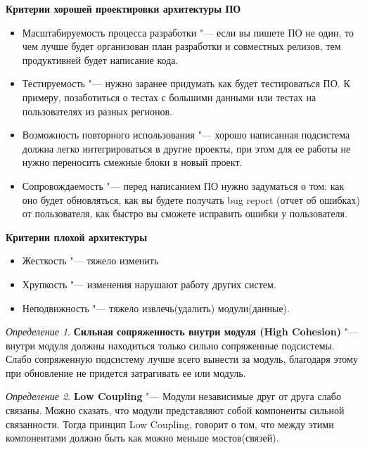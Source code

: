 \documentclass[bachelor, och, pract]{SCWorks}
\theoremstyle{remark}
\newtheorem{definition}{Определение}
\begin{document}
    \hfill \break
    \textbf{Критерии хорошей проектировки архитектуры ПО}

    \begin{itemize}[label=$\bullet$]
        \item Масштабируемость процесса разработки "--- если вы пишете ПО не один, то чем лучше будет организован план разработки и совместных релизов, тем продуктивней будет написание кода.
        \item Тестируемость "--- нужно заранее придумать как будет тестироваться ПО. К примеру, позаботиться о тестах с большими данными или тестах на пользователях из разных регионов.
        \item Возможность повторного использования "--- хорошо написанная подсистема должна легко интегрироваться в другие проекты, при этом для ее работы не нужно переносить смежные блоки в новый проект.
        \item Сопровождаемость "--- перед написанием ПО нужно задуматься о том: как оно будет обновляться, как вы будете получать bug report (отчет об ошибках) от пользователя, как быстро вы сможете исправить ошибки у пользователя.
    \end{itemize}
    
    \hfill \break
    \textbf{Критерии плохой архитектуры }

    \begin{itemize}[label=$\bullet$]
        \item Жесткость "--- тяжело изменить
        \item Хрупкость "--- изменения нарушают работу других систем.
        \item Неподвижность "--- тяжело извлечь(удалить) модули(данные).
    \end{itemize}

    \begin{definition}
        \textbf{Сильная сопряженность внутри модуля (High Cohesion)} "--- внутри модуля должны находиться только сильно сопряженные подсистемы. Слабо сопряженную подсистему лучше всего вынести за модуль, благодаря этому при обновление не придется затрагивать ее или модуль. 
    \end{definition}

    \begin{definition}
        \textbf{Low Coupling} "--- Модули независимые друг от друга слабо связаны. Можно сказать, что модули представляют собой компоненты сильной связанности. Тогда принцип Low Coupling, говорит о том, что между этими компонентами должно быть как можно меньше мостов(связей).
    \end{definition}
\end{document}
